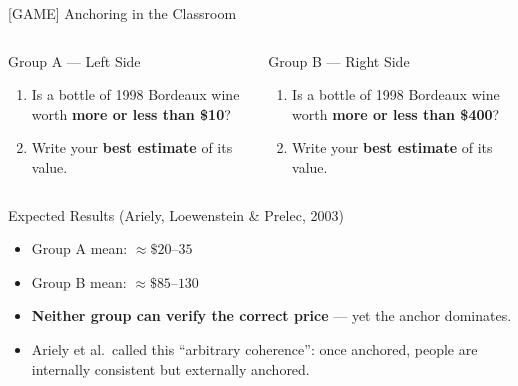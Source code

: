 \documentclass[aspectratio=169]{beamer}
\begin{document}
\begin{frame}{[GAME] Anchoring in the Classroom}
\begin{columns}
\begin{block}{Group A --- Left Side}
\begin{enumerate}
  \item Is a bottle of 1998 Bordeaux wine worth \textbf{more or less than \$10}?
  \item Write your \textbf{best estimate} of its value.
\end{enumerate}
\end{block}
\begin{alertblock}{Group B --- Right Side}
\begin{enumerate}
  \item Is a bottle of 1998 Bordeaux wine worth \textbf{more or less than \$400}?
  \item Write your \textbf{best estimate} of its value.
\end{enumerate}
\end{alertblock}
\end{columns}
\pause
\medskip
\begin{block}{Expected Results (Ariely, Loewenstein \& Prelec, 2003)}
\begin{itemize}
  \item Group A mean: $\approx \$20$--$35$
  \item Group B mean: $\approx \$85$--$130$
  \item \textbf{Neither group can verify the correct price} --- yet the anchor dominates.
  \item Ariely et al.\ called this \alert{``arbitrary coherence''}: once anchored, people are internally consistent but externally anchored.
\end{itemize}
\end{block}
\end{frame}
\end{document}
